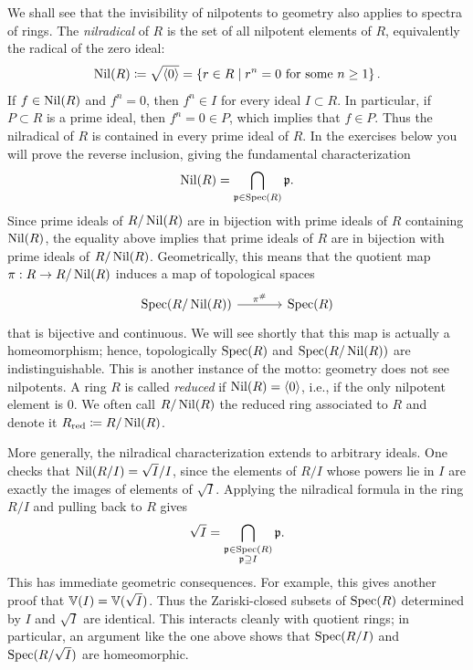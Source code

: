 \documentclass[12pt,reqno]{amsart}
\begin{document}
We shall see that the invisibility of nilpotents to geometry also applies to spectra of rings. The \emph{nilradical} of $R$ is the set of all nilpotent elements of $R$, equivalently the radical of the zero ideal:
\[
\operatorname{Nil}(R)\coloneqq\sqrt{\langle 0\rangle}=\left\{r\in R\;\middle|\; r^n=0\text{ for some }n\geq 1\right\}.
\]
If $f \in \operatorname{Nil}(R)$ and $f^{n}=0$, then $f^{n}\in I$ for every ideal $I \subset R$. In particular, if $P \subset R$ is a prime ideal, then $f^{n}=0\in P$, which implies that $f\in P$. Thus the nilradical of $R$ is contained in every prime ideal of $R$. In the exercises below you will prove the reverse inclusion, giving the fundamental characterization
\[
\operatorname{Nil}(R)=\bigcap_{\mathfrak{p}\in\operatorname{Spec}(R)}\mathfrak{p}.
\]
Since prime ideals of $R/\operatorname{Nil}(R)$ are in bijection with prime ideals of $R$ containing $\operatorname{Nil}(R)$, the equality above implies that prime ideals of $R$ are in bijection with prime ideals of $R/\operatorname{Nil}(R)$. Geometrically, this means that the quotient map $\pi:R \to R/\operatorname{Nil}(R)$ induces a map of topological spaces
\[
\begin{tikzcd}[row sep = .5em, column sep = 3.5em]
	\Spec(R/\Nil(R)) \arrow[r, "\pi^{\#}"] & \Spec(R)
\end{tikzcd}
\]
that is bijective and continuous. We will see shortly that this map is actually a homeomorphism; hence, topologically $\operatorname{Spec}(R)$ and $\operatorname{Spec}(R/\operatorname{Nil}(R))$ are indistinguishable. This is another instance of the motto: geometry does not see nilpotents. A ring $R$ is called \emph{reduced} if $\operatorname{Nil}(R)=\langle 0 \rangle$, i.e., if the only nilpotent element is $0$. We often call $R/\operatorname{Nil}(R)$ the reduced ring associated to $R$ and denote it $R_{\operatorname{red}}\coloneqq R/\operatorname{Nil}(R)$.

More generally, the nilradical characterization extends to arbitrary ideals. One checks that $\operatorname{Nil}(R/I)=\sqrt{I}/I$, since the elements of $R/I$ whose powers lie in $I$ are exactly the images of elements of $\sqrt{I}$. Applying the nilradical formula in the ring $R/I$ and pulling back to $R$ gives
\[
\sqrt{I}=\bigcap_{\substack{\mathfrak{p}\in\operatorname{Spec}(R)\\\mathfrak{p}\supseteq I}}\mathfrak{p}.
\]
This has immediate geometric consequences. For example, this gives another proof that $\mathbb{V}(I) = \mathbb{V}(\sqrt{I})$. Thus the Zariski-closed subsets of $\operatorname{Spec}(R)$ determined by $I$ and $\sqrt{I}$ are identical. This interacts cleanly with quotient rings; in particular, an argument like the one above shows that $\operatorname{Spec}(R/I)$ and $\operatorname{Spec}(R/\sqrt{I})$ are homeomorphic.

\hrulefill
\end{document}
